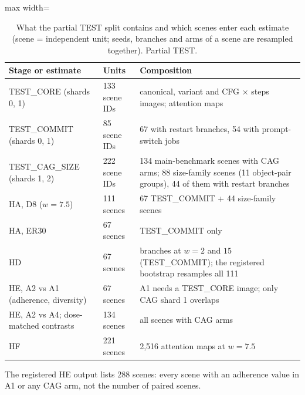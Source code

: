\begin{table}[t]\centering\small
\caption{What the partial TEST split contains and which scenes enter each estimate (scene = independent unit; seeds, branches and arms of a scene are resampled together). Partial TEST.}\label{tab:partial-units}
\begin{adjustbox}{max width=\linewidth}\begin{tabular}{llp{7.2cm}}
\toprule
Stage or estimate & Units & Composition \\
\midrule
TEST\_CORE (shards 0, 1) & 133 scene IDs & canonical, variant and CFG $\times$ steps images; attention maps \\
TEST\_COMMIT (shards 0, 1) & 85 scene IDs & 67 with restart branches, 54 with prompt-switch jobs \\
TEST\_CAG\_SIZE (shards 1, 2) & 222 scene IDs & 134 main-benchmark scenes with CAG arms; 88 size-family scenes (11 object-pair groups), 44 of them with restart branches \\
\midrule HA, D8 ($w = 7.5$) & 111 scenes & 67 TEST\_COMMIT + 44 size-family scenes \\
HA, ER30 & 67 scenes & TEST\_COMMIT only \\
HD & 67 scenes & branches at $w = 2$ and $15$ (TEST\_COMMIT); the registered bootstrap resamples all 111 \\
HE, A2 vs A1 (adherence, diversity) & 67 scenes & A1 needs a TEST\_CORE image; only CAG shard 1 overlaps \\
HE, A2 vs A4; dose-matched contrasts & 134 scenes & all scenes with CAG arms \\
HF & 221 scenes & 2,516 attention maps at $w = 7.5$ \\
\bottomrule
\end{tabular}\end{adjustbox}
\par\smallskip\footnotesize The registered HE output lists 288 scenes: every scene with an adherence value in A1 or any CAG arm, not the number of paired scenes.
\end{table}
